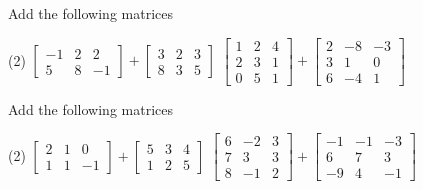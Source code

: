 \begin{exercise}
Add the following matrices
\begin{tasks}(2)
\task
$\begin{bmatrix}
-1 & 2 & 2 \\
5 & 8 & -1
\end{bmatrix}
+
\begin{bmatrix}
3 & 2 & 3 \\
8 & 3 & 5
\end{bmatrix}$
\task
$\begin{bmatrix}
1 & 2 & 4 \\
2 & 3 & 1 \\
0 & 5 & 1
\end{bmatrix}
+
\begin{bmatrix}
2 & -8 & -3 \\
3 & 1 & 0 \\
6 & -4 & 1
\end{bmatrix}$
\end{tasks}
\end{exercise}

\begin{exercise}\ansMark%
Add the following matrices
\begin{tasks}(2)
\task
$\begin{bmatrix}
2 & 1 & 0 \\
1 & 1 & -1
\end{bmatrix}
+
\begin{bmatrix}
5 & 3 & 4 \\
1 & 2 & 5
\end{bmatrix}$
\task
$\begin{bmatrix}
6 & -2 & 3 \\
7 & 3 & 3 \\
8 & -1 & 2
\end{bmatrix}
+
\begin{bmatrix}
-1 & -1 & -3 \\
6 & 7 & 3 \\
-9 & 4 & -1
\end{bmatrix}$
\end{tasks}
\end{exercise}

